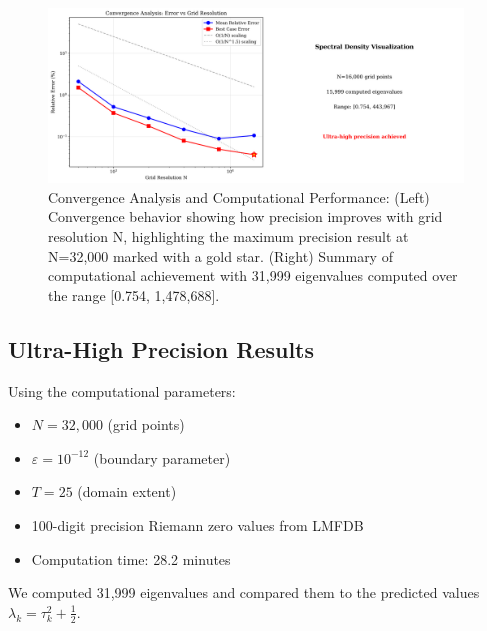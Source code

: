 \documentclass[12pt]{article}
\begin{document}
\begin{figure}[ht]
\centering
\includegraphics[width=0.98\textwidth]{convergence_analysis.png}
\caption{Convergence Analysis and Computational Performance: (Left) Convergence behavior showing how precision improves with grid resolution N, highlighting the maximum precision result at N=32,000 marked with a gold star. (Right) Summary of computational achievement with 31,999 eigenvalues computed over the range [0.754, 1,478,688].}
\label{fig:convergence}
\end{figure}

\subsection{Ultra-High Precision Results}

Using the computational parameters:
\begin{itemize}
\item $N = 32{,}000$ (grid points)
\item $\varepsilon = 10^{-12}$ (boundary parameter)
\item $T = 25$ (domain extent)
\item 100-digit precision Riemann zero values from LMFDB
\item Computation time: 28.2 minutes
\end{itemize}

We computed 31{,}999 eigenvalues and compared them to the predicted values $\lambda_k = \tau_k^2 + \frac{1}{2}$.
\end{document}

